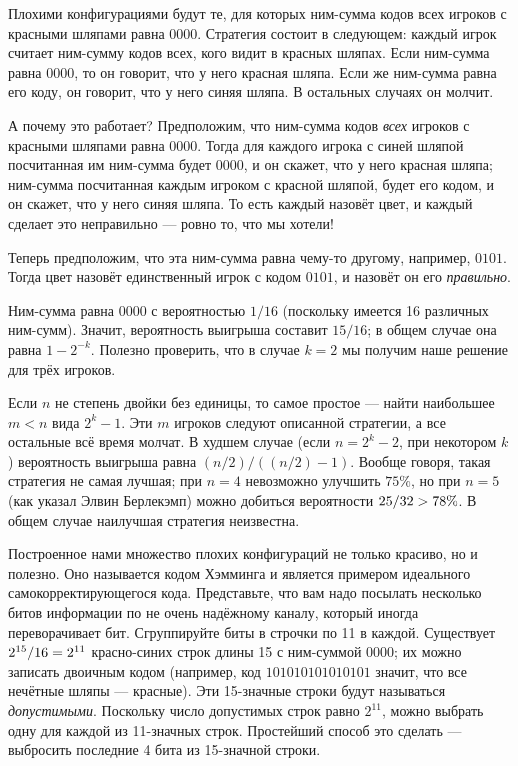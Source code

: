 Плохими конфигурациями будут те, для которых ним-сумма кодов всех игроков с красными шляпами равна $0000$.
Стратегия состоит в следующем:
каждый игрок считает ним-сумму кодов всех, кого видит в красных шляпах.
Если ним-сумма равна $0000$, то он говорит, что у него красная шляпа.
Если же ним-сумма равна его коду, он говорит, что у него синяя шляпа.
В остальных случаях он молчит.

А почему это работает?
Предположим, что ним-сумма кодов \emph{всех} игроков с красными шляпами равна $0000$.
Тогда для каждого игрока с синей шляпой посчитанная им ним-сумма будет $0000$, и он скажет, что у него красная шляпа;
ним-сумма посчитанная каждым игроком с красной шляпой, будет его кодом, и он скажет, что у него синяя шляпа.
То есть каждый назовёт цвет, и каждый сделает это неправильно --- ровно то, что мы хотели!

Теперь  предположим, что эта ним-сумма равна чему-то другому, например, $0101$.
Тогда цвет назовёт единственный игрок с кодом  $0101$, и назовёт он его \emph{правильно}.

Ним-сумма равна $0000$ с вероятностью $1/16$ (поскольку имеется 16 различных ним-сумм).
Значит, вероятность выигрыша составит $15/16$;
в общем случае она равна $1-2^{-k}$.
Полезно проверить, что в случае $k=2$ мы получим наше решение для трёх игроков.

Если $n$ не степень двойки без единицы, то самое простое --- найти наибольшее $m<n$ вида $2^k-1$.
Эти $m$ игроков следуют описанной стратегии, а все остальные всё время молчат.
В худшем случае (если $n=2^k-2$, при некотором $k$) вероятность выигрыша равна $(n/2)/((n/2)-1)$.
Вообще говоря, такая стратегия не самая лучшая;
при $n=4$ невозможно улучшить $75\%$, но при $n=5$ (как указал Элвин Берлекэмп) можно добиться вероятности $25/32\z>78\%$.
В общем случае наилучшая стратегия неизвестна.
\heart

Построенное нами множество плохих конфигураций не только красиво, но и полезно.
Оно называется кодом Хэмминга и является примером идеального самокорректирующегося кода.
Представьте, что вам надо посылать несколько битов информации по не очень надёжному каналу, который иногда переворачивает бит.
Сгруппируйте биты в строчки по 11 в каждой.
Существует $2^{15}/16\z=2^{11}$ красно-синих строк длины 15 с ним-суммой $0000$;
их можно записать двоичным кодом (например, код $101010101010101$ значит, что все нечётные шляпы --- красные).
Эти 15-значные строки будут называться \emph{допустимыми}.
Поскольку число допустимых строк равно $2^{11}$, можно выбрать одну для каждой из 11-значных строк.
Простейший способ это сделать --- выбросить последние 4 бита из 15-значной строки.

